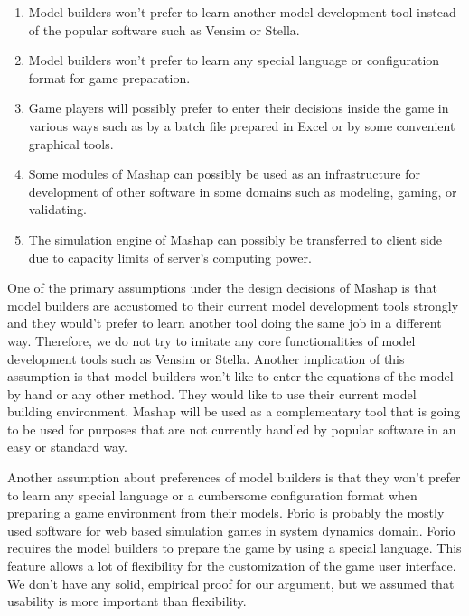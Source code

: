 \documentclass[12pt,a4paper]{paper}
\begin{document}
\begin{enumerate}
	\item Model builders won't prefer to learn another model development tool instead of the popular software such as Vensim or Stella. 
	\item Model builders won't prefer to learn any special language or configuration format for game preparation.
	\item Game players will possibly prefer to enter their decisions inside the game in various ways such as by a batch file prepared in Excel or by some convenient graphical tools.
	\item Some modules of Mashap can possibly be used as an infrastructure for development of other software in some domains such as modeling, gaming, or validating.
	\item The simulation engine of Mashap can possibly be transferred to client side due to capacity limits of server's computing power.
\end{enumerate}

One of the primary assumptions under the design decisions of Mashap is that model builders are accustomed to their current model development tools strongly and they would't prefer to learn another tool doing the same job in a different way. Therefore, we do not try to imitate any core functionalities of model development tools such as Vensim or Stella. Another implication of this assumption is that model builders won't like to enter the equations of the model by hand or any other method. They would like to use their current model building environment. Mashap will be used as a complementary tool that is going to be used for purposes that are not currently handled by popular software in an easy or standard way.

Another assumption about preferences of model builders is that they won't prefer to learn any special language or a cumbersome configuration format when preparing a game environment from their models. Forio is probably the mostly used software for web based simulation games in system dynamics domain. Forio requires the model builders to prepare the game by using a special language. This feature allows a lot of flexibility for the customization of the game user interface. We don't have any solid, empirical proof for our argument, but we assumed that usability is more important than flexibility.
\end{document}
